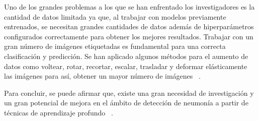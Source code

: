 Uno de los grandes problemas a los que se han enfrentado los investigadores es la cantidad de datos limitada ya que, al trabajar con modelos previamente entrenados, se necesitan grandes cantidades de datos además de hiperparámetros configurados correctamente para obtener los mejores resultados. Trabajar con un gran número de imágenes etiquetadas es fundamental para una correcta clasificación y predicción. Se han aplicado algunos métodos para el aumento de datos como voltear, rotar, recortar, escalar, trasladar y deformar elásticamente las imágenes para así, obtener un mayor número de imágenes ~\cite{sharma2024systematic}.

Para concluir, se puede afirmar que, existe una gran necesidad de investigación y un gran potencial de mejora en el ámbito de detección de neumonía a partir de técnicas de aprendizaje profundo ~\cite{sharma2024systematic}.



